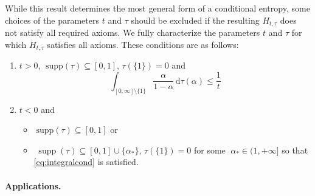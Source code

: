 \documentclass[aps,pra,11pt,onecolumn,nofootinbib,tightenlines]{revtex4-2}
\theoremstyle{definition}
\begin{document}
While this result determines the most general form of a conditional entropy, some choices of the parameters \(t\) and \(\tau\) should be excluded if the resulting \(H_{t,\tau}\) does not satisfy all required axioms.
We fully characterize the parameters $t$ and $\tau$ for which $H_{t,\tau}$ satisfies all axioms.
These conditions are as follows:
\begin{enumerate}
    \item $t> 0$, $\;\text{supp}(\tau) \subseteq [0,1]$, $\tau(\{1\})=0$ and
    \begin{equation}\label{eq:integralcond}
    \int_{[0,\infty]\setminus\{1\}}\frac{\alpha}{1-\alpha}\,\mathrm{d}\tau(\alpha)\leq \frac{1}{t}
    \end{equation}
    \item $t < 0$ and
    \begin{itemize}
    \item[(a)] $\;\text{supp}(\tau) \subseteq [0,1]$ or
    \item[(b)] $\;\operatorname{supp}(\tau) \subseteq [0,1] \cup \{\alpha_*\}$, $\tau(\{1\})=0$ for some $\;\alpha_* \in (1, +\infty]$ so that   \eqref{eq:integralcond} is satisfied.
    \end{itemize}
\end{enumerate}


\paragraph*{Applications.}
\end{document}
